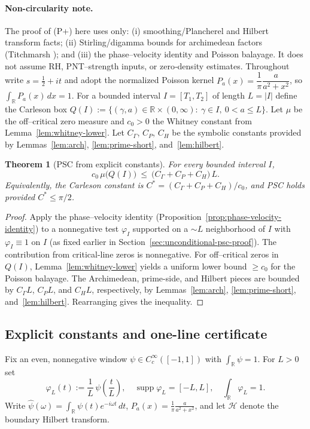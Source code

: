 \documentclass[11pt]{article}
\newtheorem{theorem}{Theorem}
\theoremstyle{definition}
\theoremstyle{remark}
\newcommand{\R}{\mathbb{R}}
\newcommand{\Poisson}{P}
\begin{document}
\paragraph{Non-circularity note.}
The proof of (P+) here uses only: (i) smoothing/Plancherel and Hilbert transform facts; (ii) Stirling/digamma bounds for archimedean factors (Titchmarsh \cite[Ch.~IV]{TitchmarshZeta}); and (iii) the phase–velocity identity and Poisson balayage. It does not assume RH, PNT–strength inputs, or zero‑density estimates.
Throughout write $s=\tfrac12+it$ and adopt the normalized Poisson kernel $P_a(x)=\dfrac{1}{\pi}\dfrac{a}{a^2+x^2}$, so $\int_\R P_a(x)\,dx=1$. For a bounded interval $I=[T_1,T_2]$ of length $L=|I|$ define the Carleson box $Q(I):=\{(\gamma,a)\in\R\times(0,\infty):\ \gamma\in I,\ 0<a\le L\}$. Let $\mu$ be the off--critical zero measure and $c_0>0$ the Whitney constant from Lemma~\ref{lem:whitney-lower}. Let $C_\Gamma$, $C_P$, $C_H$ be the symbolic constants provided by Lemmas~\ref{lem:arch}, \ref{lem:prime-short}, and~\ref{lem:hilbert}.
\begin{theorem}[PSC from explicit constants]\label{thm:psc-constants}
For every bounded interval $I$,
\[ c_0\,\mu\big(Q(I)\big)\ \le\ \big(C_\Gamma + C_P + C_H\big)\,L. \]
Equivalently, the Carleson constant is $C^*=(C_\Gamma + C_P + C_H)/c_0$, and PSC holds provided $C^*\le \pi/2$.
\end{theorem}
\begin{proof}
Apply the phase--velocity identity (Proposition~\ref{prop:phase-velocity-identity}) to a nonnegative test $\varphi_I$ supported on a $\sim L$ neighborhood of $I$ with $\varphi_I\equiv 1$ on $I$ (as fixed earlier in Section~\ref{sec:unconditional-psc-proof}). The contribution from critical-line zeros is nonnegative. For off--critical zeros in $Q(I)$, Lemma~\ref{lem:whitney-lower} yields a uniform lower bound $\ge c_0$ for the Poisson balayage. The Archimedean, prime-side, and Hilbert pieces are bounded by $C_\Gamma L$, $C_P L$, and $C_H L$, respectively, by Lemmas~\ref{lem:arch}, \ref{lem:prime-short}, and~\ref{lem:hilbert}. Rearranging gives the inequality.
\end{proof}

\subsection{Explicit constants and one-line certificate}\label{sec:certificate}
Fix an even, nonnegative window $\psi\in C_c^\infty([-1,1])$ with $\int_\R\psi=1$. For $L>0$ set
\[ \varphi_L(t):=\frac{1}{L}\,\psi\!\left(\frac{t}{L}\right),\quad \operatorname{supp}\varphi_L=[-L,L],\quad \int_\R \varphi_L=1. \]
Write $\widehat\psi(\omega)=\int_\R \psi(t)e^{-i\omega t}\,dt$, $\Poisson_a(x)=\tfrac{1}{\pi}\tfrac{a}{a^2+x^2}$, and let $\mathcal H$ denote the boundary Hilbert transform.
\end{document}
